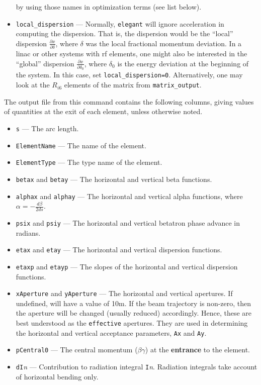 \documentclass[11pt]{article}
\begin{document}
\begin{itemize}
 by using those names in optimization terms (see list below).
\item \verb|local_dispersion| ---  Normally, {\tt elegant} will ignore acceleration in computing the
  dispersion.  That is, the dispersion would be the ``local'' dispersion $\frac{\partial x}{\partial \delta}$, where $\delta$
  was the local fractional momentum deviation.  In a linac or other systems with rf elements, one might also be interested in the ``global'' dispersion
  $\frac{\partial x}{\partial \delta_0}$, where $\delta_0$ is the energy deviation at the beginning of the system.
  In this case, set \verb|local_dispersion=0|.  Alternatively, one may look at the $R_{i6}$ elements of the matrix from 
  \verb|matrix_output|.
\end{itemize}

The output file from this command contains the following columns, giving values of quantities at the
exit of each element, unless otherwise noted.
\begin{itemize}
\item {\tt s} --- The arc length.
\item {\tt ElementName} --- The name of the element.
\item {\tt ElementType} --- The type name of the element.
\item {\tt betax} and {\tt betay} --- The horizontal and vertical beta functions.
\item {\tt alphax} and {\tt alphay} --- The horizontal and vertical alpha functions, where $\alpha = -\frac{d \beta}{2 ds}$.
\item {\tt psix} and {\tt psiy} --- The horizontal and vertical betatron phase advance in radians.
\item {\tt etax} and {\tt etay} --- The horizontal and vertical dispersion functions.
\item {\tt etaxp} and {\tt etayp} --- The slopes of the horizontal and vertical dispersion functions.
\item {\tt xAperture} and {\tt yAperture} --- The horizontal and vertical apertures.  If undefined, will have a 
 value of 10m.  If the beam trajectory is non-zero, then the aperture will be changed (usually reduced) accordingly.  Hence, these
 are best understood as the {\tt effective} apertures.  They are used in determining the horizontal and vertical acceptance
 parameters, {\tt Ax} and {\tt Ay}.
\item {\tt pCentral0} --- The central momentum ($\beta\gamma$) at the {\bf entrance} to the element.
\item {\tt dI}{\em n} --- Contribution to radiation integral {\tt I}{\em n}.  Radiation integrals take account of
  horizontal bending only.
\end{itemize}
\end{document}
